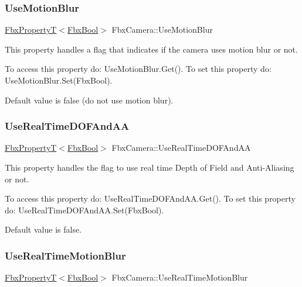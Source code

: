 \subsubsection{\texorpdfstring{Use\+Motion\+Blur}{UseMotionBlur}}
{\footnotesize\ttfamily \hyperlink{class_fbx_property_t}{Fbx\+PropertyT}$<$\hyperlink{fbxtypes_8h_a92e0562b2fe33e76a242f498b362262e}{Fbx\+Bool}$>$ Fbx\+Camera\+::\+Use\+Motion\+Blur}

This property handles a flag that indicates if the camera uses motion blur or not.

To access this property do\+: Use\+Motion\+Blur.\+Get(). To set this property do\+: Use\+Motion\+Blur.\+Set(\+Fbx\+Bool).

Default value is false (do not use motion blur). \mbox{\label{class_fbx_camera_a57b4706a5d4d2678c5e31430b9a4ba61}} 
\subsubsection{\texorpdfstring{Use\+Real\+Time\+D\+O\+F\+And\+AA}{UseRealTimeDOFAndAA}}
{\footnotesize\ttfamily \hyperlink{class_fbx_property_t}{Fbx\+PropertyT}$<$\hyperlink{fbxtypes_8h_a92e0562b2fe33e76a242f498b362262e}{Fbx\+Bool}$>$ Fbx\+Camera\+::\+Use\+Real\+Time\+D\+O\+F\+And\+AA}

This property handles the flag to use real time Depth of Field and Anti-\/\+Aliasing or not.

To access this property do\+: Use\+Real\+Time\+D\+O\+F\+And\+A\+A.\+Get(). To set this property do\+: Use\+Real\+Time\+D\+O\+F\+And\+A\+A.\+Set(\+Fbx\+Bool).

Default value is false. \mbox{\label{class_fbx_camera_a99d0cb2281144454e44128d66be54b26}} 
\subsubsection{\texorpdfstring{Use\+Real\+Time\+Motion\+Blur}{UseRealTimeMotionBlur}}
{\footnotesize\ttfamily \hyperlink{class_fbx_property_t}{Fbx\+PropertyT}$<$\hyperlink{fbxtypes_8h_a92e0562b2fe33e76a242f498b362262e}{Fbx\+Bool}$>$ Fbx\+Camera\+::\+Use\+Real\+Time\+Motion\+Blur}

